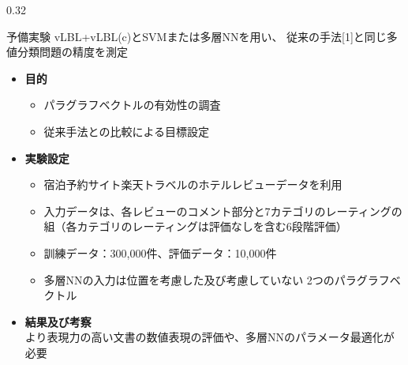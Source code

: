 \documentclass[8pt,unicode]{beamer}
\newcommand{\columnscale}{0.32}
\newcommand{\itemtitle}[1]{\textbf{#1} \\}
\begin{document}
\begin{frame}{}
\begin{columns}[t]
\begin{column}{\columnscale\textwidth} %
  \begin{block}{予備実験}
    vLBL+vLBL(c)とSVMまたは多層NNを用い、
    従来の手法[1]と同じ多値分類問題の精度を測定

    \begin{itemize}
      \item \itemtitle{目的}
      \begin{itemize}
        \item パラグラフベクトルの有効性の調査
        \item 従来手法との比較による目標設定
      \end{itemize}

      \item \itemtitle{実験設定}
      \begin{itemize}
        \item 宿泊予約サイト楽天トラベルのホテルレビューデータを利用
        \item 入力データは、各レビューのコメント部分と7カテゴリのレーティングの
        組（各カテゴリのレーティングは評価なしを含む6段階評価）
        \item 訓練データ：300,000件、評価データ：10,000件
        \item 多層NNの入力は位置を考慮した及び考慮していない
        2つのパラグラフベクトル
      \end{itemize}

      \item \itemtitle{結果及び考察}
        より表現力の高い文書の数値表現の評価や、多層NNのパラメータ最適化が必要


    \end{itemize}


\end{block}
\end{column}
\end{columns}
\end{frame}
\end{document}

